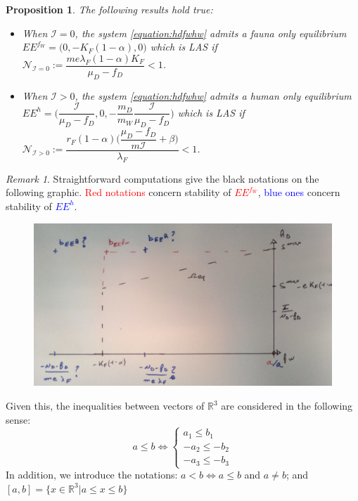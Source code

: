 \documentclass{article}
\newcommand{\lfw}{\lambda_{F}}
\newcommand{\lfw}{\lambda_{F}}
\newcommand{\cI}{\mathcal{I}}
\newtheorem{prop}[theorem]{Proposition}
\theoremstyle{definition}
\theoremstyle{remark}
\newtheorem{remark}[theorem]{Remark}
\begin{document}
\begin{prop}
The following results hold true:
\begin{itemize}
\item When $\cI = 0$, the system \eqref{equation:hdfwhw} admits a fauna only equilibrium $EE^{f_W} = \Big(0,-K_F(1-\alpha), 0 \Big)$ which is LAS if $\mathcal{N}_{\cI = 0} := \dfrac{m e \lfw (1-\alpha)K_F}{\mu_D - f_D} < 1$.
\item When $\cI > 0$, the system \eqref{equation:hdfwhw} admits a human only equilibrium $EE^{h} = \Big(\dfrac{\cI}{\mu_D - f_D}, 0, -\dfrac{m_D}{m_W}\dfrac{\cI}{\mu_D - f_D} \Big)$ which is LAS if $\mathcal{N}_{\cI > 0} := \dfrac{r_F(1-\alpha)\Big({\dfrac{\mu_D - f_D}{m\cI}+\beta\Big)}}{\lfw} < 1$.
\end{itemize}
\end{prop}
\newpage
\begin{remark}
Straightforward computations give the black notations on the following graphic. \textcolor{red}{Red notations} concern stability of\textcolor{red}{ $EE^{f_W}$}, \textcolor{blue}{blue ones} concern stability of \textcolor{blue}{$EE^{h}$}.
\begin{figure}[!ht]
\centering
\includegraphics[width=1\textwidth]{OmegaEq.jpeg}
\end{figure}

\end{remark}
Given this, the inequalities between vectors of $\mathbb{R}^3$ are considered in the following sense:
$$
a \leq b \Leftrightarrow \left\lbrace \begin{array}{l} 
a_1 \leq b_1 \\ -a_2 \leq - b_2 \\ -a_3 \leq - b_3
\end{array} \right.
$$
In addition, we introduce the notations: $a < b \Leftrightarrow a \leq b$ and $a\neq b$; and $[a,b] = \lbrace x \in \mathbb{R}^3 | a \leq x \leq b \rbrace$
\end{document}
